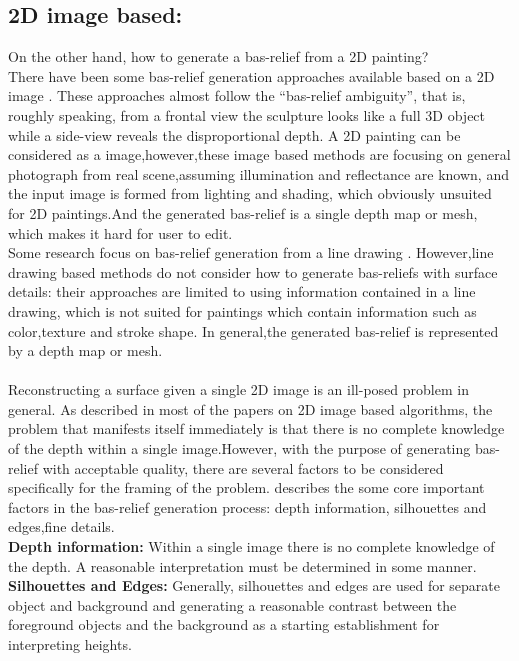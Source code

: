 \subsection{2D image based:}\label{2dimagebased} On the other hand, how to generate a bas-relief from a 2D painting? \\ There have been some bas-relief generation approaches available based on a 2D image \cite{zeng2014region}\cite{wu2013making}  \cite{alexa2010reliefs}\cite{wu2008interactive}.  These approaches almost follow the “bas-relief ambiguity”\cite{belhumeur1999bas}, that is, roughly speaking, from a frontal view the sculpture looks like a full 3D object while a side-view reveals the disproportional depth. 
A 2D painting can be considered as a image,however,these image based methods are focusing on general photograph from real scene,assuming illumination and reflectance are known, and the input image is formed from lighting and shading, which obviously unsuited for 2D paintings.And the generated bas-relief is a single depth map or mesh, which makes it hard for user to edit. \\
Some research focus on bas-relief generation from a line drawing \cite{kolomenkin2011reconstruction}\cite{varley2002estimating}\cite{malik1987interpreting}\cite{sykora2014ink}. However,line drawing based methods do not consider how to generate bas-reliefs with surface details: their approaches are limited to using information contained in a line drawing, which is not suited for paintings which contain information such as color,texture and stroke shape. In general,the generated bas-relief is represented by a depth map or mesh.  \\ \\
Reconstructing a surface given a single 2D image is an ill-posed problem in general. As described in most of the papers on 2D image based algorithms, the problem that manifests itself immediately is that there is no complete knowledge of the depth within a single image.However, with the purpose of generating bas-relief with acceptable quality, there are several factors to be considered specifically for the framing of the problem.\cite{benzaid2017analysis} describes the some core important factors in the bas-relief generation process: depth information, silhouettes and edges,fine details.\\
\textbf{Depth information:} Within a single image there is no complete knowledge of the depth. A reasonable interpretation must be determined in some manner. \\ 
\textbf{Silhouettes and Edges:} Generally, silhouettes and edges are used for separate object and background and generating a reasonable contrast between the foreground objects and the background as a starting establishment for interpreting heights. \\

